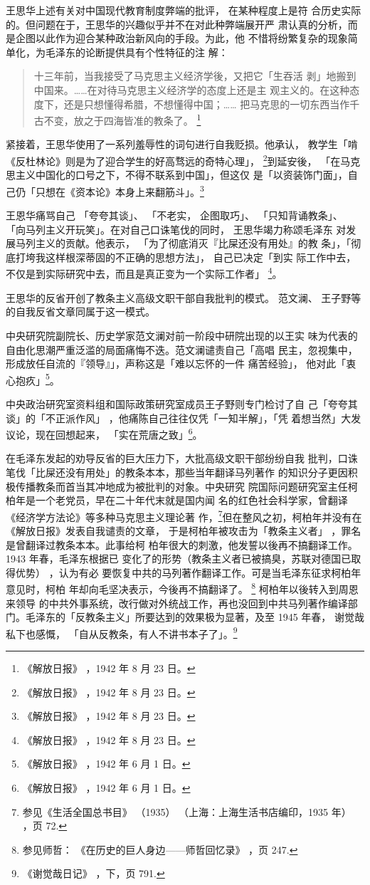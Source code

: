 王思华上述有关对中国现代教育制度弊端的批评，
在某种程度上是符
合历史实际的。但问题在于，王思华的兴趣似乎并不在对此种弊端展开严
肃认真的分析，而是企图以此作为迎合某种政治新风向的手段。为此，他
不惜将纷繁复杂的现象简单化，为毛泽东的论断提供具有个性特征的注
解：
\begin{quote}
{\fzwkai 十三年前，当我接受了马克思主义经济学後，又把它「生吞活
剥」地搬到中国来。……在对待马克思主义经济学的态度上还是主
观主义的。在这种态度下，还是只想懂得希腊，不想懂得中国；……
把马克思的一切东西当作千古不变，放之于四海皆准的教条了。
\footnote{《解放日报》
，1942 年 8 月 23 日。}} 
\end{quote}

紧接着，王思华使用了一系列羞辱性的词句进行自我贬损。他承认，
教学生「啃《反杜林论》则是为了迎合学生的好高骛远的奇特心理」，
\footnote{《解放日报》
，1942 年 8 月 23 日。}到延安後，
「在马克思主义中国化的口号之下，不得不联系到中国」，但这仅
是「以资装饰门面」，自己仍「只想在《资本论》本身上来翻筋斗」。\footnote{《解放日报》
，1942 年 8 月 23 日。} 

王恩华痛骂自己
「夸夸其谈」、
「不老实，
企图取巧」、
「只知背诵教条」、
「向马列主义开玩笑」。在对自己口诛笔伐的同时，
王思华竭力称颂毛泽东
对发展马列主义的贡献。他表示，
「为了彻底消灭『比屎还没有用处』的教
条」，「彻底打垮我这样根深蒂固的不正确的思想方法」，
自己已决定「到实
际工作中去，不仅是到实际研究中去，而且是真正变为一个实际工作者」
\footnote{《解放日报》
，1942 年 8 月 23 日。}。


王思华的反省开创了教条主义高级文职干部自我批判的模式。
范文澜、
王子野等的自我反省文章同属于这一模式。

中央研究院副院长、历史学家范文澜对前一阶段中研院出现的以王实
味为代表的自由化思潮严重泛滥的局面痛悔不迭。范文澜谴责自己「高唱
民主，忽视集中，形成放任自流的『领导』」，声称这是「难以忘怀的一件
痛苦经验」，
他对此「衷心抱疚」\footnote{《解放日报》
，1942 年 6 月 1 日。}。

中央政治研究室资料组和国际政策研究室成员王子野则专门检讨了自
己「夸夸其谈」的「不正派作风」
，他痛陈自己往往仅凭「一知半解」，「凭
着想当然」大发议论，现在回想起来，
「实在荒唐之致」\footnote{《解放日报》
，1942 年 6 月 1 日。}。

在毛泽东发起的劝导反省的巨大压力下，大批高级文职干部纷纷自我
批判，口诛笔伐「比屎还没有用处」的教条本本，那些当年翻译马列著作
的知识分子更因积极传播教条而首当其冲地成为被批判的对象。中央研究
院国际问题研究室主任柯柏年是一个老党员，早在二十年代末就是国内闻
名的红色社会科学家，曾翻译《经济学方法论》等多种马克思主义理论著
作，\footnote{参见《生活全国总书目》
（1935）
（上海：上海生活书店编印，1935 年）
，页 72.}但在整风之初，柯柏年并没有在《解放日报》发表自我谴责的文章，
于是柯柏年被攻击为「教条主义者」
，罪名是曾翻译过教条本本。此事给柯
柏年很大的刺激，他发誓以後再不搞翻译工作。1943 年春，毛泽东根据已
变化了的形势（教条主义者已被搞臭，苏联对德国已取得优势）
，认为有必
要恢复中共的马列著作翻译工作。可是当毛泽东征求柯柏年意见时，柯柏
年却向毛坚决表示，今後再不搞翻译了。
\footnote{参见师哲：
《在历史的巨人身边——师哲回忆录》
，页 247.}
柯柏年以後转入到周恩来领导
的中共外事系统，改行做对外统战工作，再也没回到中共马列著作编译部
门。毛泽东的「反教条主义」所要达到的效果极为显著，及至 1945 年春，
谢觉哉私下也感慨，
「自从反教条，有人不讲书本子了」。\footnote{ 《谢觉哉日记》
，下，页 791.} 

